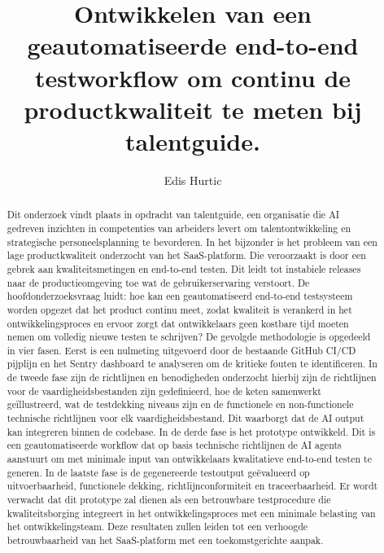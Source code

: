 \documentclass{hogent-article}
\title{Ontwikkelen van een geautomatiseerde end-to-end testworkflow om continu de productkwaliteit te meten bij talentguide.}
\author{Edis Hurtic}
\begin{document}
\begin{abstract}
Dit onderzoek vindt plaats in opdracht van talentguide, een organisatie die AI gedreven inzichten in competenties van arbeiders levert om talentontwikkeling en strategische personeelsplanning te bevorderen. In het bijzonder is het probleem van een lage productkwaliteit onderzocht van het SaaS-platform. Die veroorzaakt is door een gebrek aan kwaliteitsmetingen en end-to-end testen. Dit leidt tot instabiele releases naar de productieomgeving toe wat de gebruikerservaring verstoort.
De hoofdonderzoeksvraag luidt: hoe kan een geautomatiseerd end-to-end testsysteem worden opgezet dat het product continu meet, zodat kwaliteit is verankerd in het ontwikkelingsproces en ervoor zorgt dat ontwikkelaars geen kostbare tijd moeten nemen om volledig nieuwe testen te schrijven?
De gevolgde methodologie is opgedeeld in vier fasen. Eerst is een nulmeting uitgevoerd door de bestaande GitHub CI/CD pijplijn en het Sentry dashboard te analyseren om de kritieke fouten te identificeren.
In de tweede fase zijn de richtlijnen en benodigheden onderzocht hierbij zijn de richtlijnen voor de vaardigheidsbestanden zijn gedefinieerd, hoe de keten samenwerkt geïllustreerd, wat de testdekking niveaus zijn en de functionele en non-functionele technische richtlijnen voor elk vaardigheidsbestand. Dit waarborgt dat de AI output kan integreren binnen de codebase.
In de derde fase is het prototype ontwikkeld. Dit is een geautomatiseerde workflow dat op basis technische richtlijnen de AI agents aanstuurt om met minimale input van ontwikkelaars kwalitatieve end-to-end testen te generen. 
In de laatste fase is de gegenereerde testoutput geëvalueerd op uitvoerbaarheid, functionele dekking, richtlijnconformiteit en traceerbaarheid.
Er wordt verwacht dat dit prototype zal dienen als een betrouwbare testprocedure die kwaliteitsborging integreert in het ontwikkelingsproces met een minimale belasting van het ontwikkelingsteam. Deze resultaten zullen leiden tot een verhoogde betrouwbaarheid van het SaaS-platform met een toekomstgerichte aanpak.


\end{abstract}

\tableofcontents



\printbibliography[heading=bibintoc]
\end{document}

